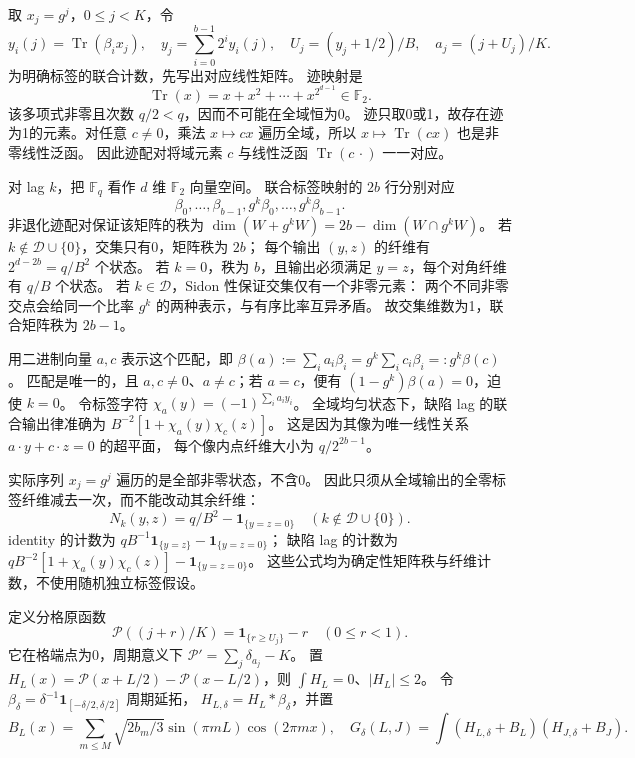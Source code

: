 取 $x_j=g^j$，$0\le j<K$，令
\[
 y_i(j)=\operatorname{Tr}(\beta_ix_j),\quad
 y_j=\sum_{i=0}^{b-1}2^iy_i(j),\quad
 U_j=(y_j+1/2)/B,\quad a_j=(j+U_j)/K.
\]
为明确标签的联合计数，先写出对应线性矩阵。
迹映射是
\[
 \operatorname{Tr}(x)=x+x^2+\cdots+x^{2^{d-1}}\in\mathbb F_2.
\]
该多项式非零且次数 $q/2<q$，因而不可能在全域恒为0。
迹只取0或1，故存在迹为1的元素。对任意 $c\ne0$，乘法 $x\mapsto cx$
遍历全域，所以 $x\mapsto\operatorname{Tr}(cx)$ 也是非零线性泛函。
因此迹配对将域元素 $c$ 与线性泛函 $\operatorname{Tr}(c\,\cdot)$ 一一对应。

对 lag $k$，把 $\mathbb F_q$ 看作 $d$ 维 $\mathbb F_2$ 向量空间。
联合标签映射的 $2b$ 行分别对应
\[
 \beta_0,\ldots,\beta_{b-1},g^k\beta_0,\ldots,g^k\beta_{b-1}.
\]
非退化迹配对保证该矩阵的秩为
$\dim(W+g^kW)=2b-\dim(W\cap g^kW)$。
若 $k\notin\mathcal D\cup\{0\}$，交集只有0，矩阵秩为 $2b$；
每个输出 $(y,z)$ 的纤维有 $2^{d-2b}=q/B^2$ 个状态。
若 $k=0$，秩为 $b$，且输出必须满足 $y=z$，每个对角纤维有 $q/B$ 个状态。
若 $k\in\mathcal D$，Sidon 性保证交集仅有一个非零元素：
两个不同非零交点会给同一个比率 $g^k$ 的两种表示，与有序比率互异矛盾。
故交集维数为1，联合矩阵秩为 $2b-1$。

用二进制向量 $a,c$ 表示这个匹配，即
$\beta(a):=\sum_i a_i\beta_i=g^k\sum_i c_i\beta_i=:g^k\beta(c)$。
匹配是唯一的，且 $a,c\ne0$、$a\ne c$；若 $a=c$，便有
$(1-g^k)\beta(a)=0$，迫使 $k=0$。
令标签字符 $\chi_a(y)=(-1)^{\sum_i a_iy_i}$。
全域均匀状态下，缺陷 lag 的联合输出律准确为
$B^{-2}[1+\chi_a(y)\chi_c(z)]$。
这是因为其像为唯一线性关系 $a\cdot y+c\cdot z=0$ 的超平面，
每个像内点纤维大小为 $q/2^{2b-1}$。

实际序列 $x_j=g^j$ 遍历的是全部非零状态，不含0。
因此只须从全域输出的全零标签纤维减去一次，而不能改动其余纤维：
\begin{equation}\label{eq:paperlabelcount}
 N_k(y,z)=q/B^2-\mathbf1_{\{y=z=0\}}
 \quad(k\notin\mathcal D\cup\{0\}).
\end{equation}
identity 的计数为
$qB^{-1}\mathbf1_{\{y=z\}}-\mathbf1_{\{y=z=0\}}$；
缺陷 lag 的计数为
$qB^{-2}[1+\chi_a(y)\chi_c(z)]-\mathbf1_{\{y=z=0\}}$。
这些公式均为确定性矩阵秩与纤维计数，不使用随机独立标签假设。

定义分格原函数
\[
 \mathcal P((j+r)/K)=\mathbf1_{\{r\ge U_j\}}-r\quad(0\le r<1).
\]
它在格端点为0，周期意义下 $\mathcal P'=\sum_j\delta_{a_j}-K$。
置 $H_L(x)=\mathcal P(x+L/2)-\mathcal P(x-L/2)$，则 $\int H_L=0$、$|H_L|\le2$。
令 $\beta_\delta=\delta^{-1}\mathbf1_{[-\delta/2,\delta/2]}$ 周期延拓，
$H_{L,\delta}=H_L*\beta_\delta$，并置
\[
 B_L(x)=\sum_{m\le M}\sqrt{2b_m/3}\sin(\pi mL)\cos(2\pi mx),
 \quad G_\delta(L,J)=\int(H_{L,\delta}+B_L)(H_{J,\delta}+B_J).
\]

